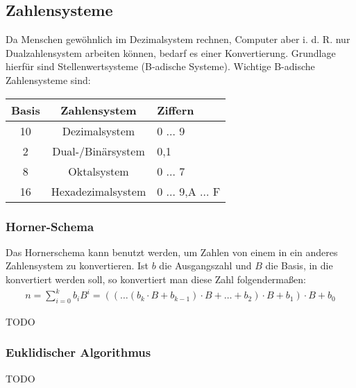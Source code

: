 \documentclass[11pt]{article}
\begin{document}
\subsection{Zahlensysteme}
Da Menschen gewöhnlich im Dezimalsystem rechnen, Computer aber i. d. R. nur Dualzahlensystem arbeiten können, bedarf es einer Konvertierung. Grundlage hierfür sind Stellenwertsysteme (B-adische Systeme).
Wichtige B-adische Zahlensysteme sind:
\begin{center}
  \begin{tabular}{ccl}
    \textbf{Basis} & \textbf{Zahlensystem} & \textbf{Ziffern} \\ \hline
    10 & Dezimalsystem & 0 \(\dots\) 9 \\
    2 & Dual-/Binärsystem & 0,1 \\
    8 & Oktalsystem & 0 \(\dots\) 7 \\
    16 & Hexadezimalsystem & 0 \(\dots\) 9,A \(\dots\) F
  \end{tabular}
\end{center}
\subsubsection{Horner-Schema}
Das Hornerschema kann benutzt werden, um Zahlen von einem in ein anderes Zahlensystem zu konvertieren. Ist \(b\) die Ausgangszahl und \(B\) die Basis, in die konvertiert werden soll, so konvertiert man diese Zahl folgendermaßen:
\begin{align}
  n = \sum\limits_{i=0}^kb_iB^i = ((\dots (b_k \cdot B + b_{k-1})\cdot B + \dots + b_2) \cdot B + b_1) \cdot B + b_0
\end{align}

\large{TODO}

\subsubsection{Euklidischer Algorithmus}
\large{TODO}
\end{document}
